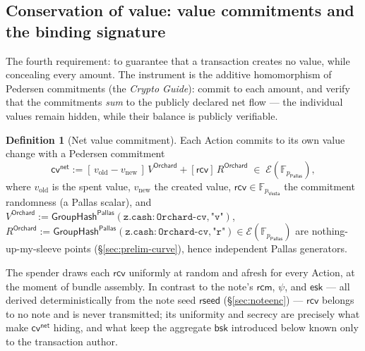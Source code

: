 \documentclass[11pt,a4paper]{article}
\theoremstyle{definition}
\newtheorem{definition}[theorem]{Definition}
\newcommand{\F}{\mathbb{F}}
\newcommand{\cvsym}{\mathsf{cv}}
\newcommand{\Pallas}{\ensuremath{\mathsf{Pallas}}}
\newcommand{\Vesta}{\ensuremath{\mathsf{Vesta}}}
\newcommand{\Ep}{\ensuremath{\mathcal{E}}}
\newcommand{\GroupHash}{\ensuremath{\mathsf{GroupHash}}}
\newcommand{\rcv}{\ensuremath{\mathsf{rcv}}}
\newcommand{\rcm}{\ensuremath{\mathsf{rcm}}}
\begin{document}
\subsection{Conservation of value: value commitments and the binding signature}\label{sec:value}

The fourth requirement: to guarantee that a transaction creates no value, while
concealing every amount. The instrument is the additive homomorphism of
Pedersen commitments (the \emph{Crypto Guide}): commit to each amount, and
verify that the commitments \emph{sum} to the publicly declared net flow --- the
individual values remain hidden, while their balance is publicly verifiable.

\begin{definition}[Net value commitment]\label{def:cv}
Each Action commits to its own value change with a Pedersen commitment
\[
\cvsym^{\mathsf{net}} := [\,v_{\mathrm{old}} - v_{\mathrm{new}}\,]\,V^{\mathsf{Orchard}} + [\rcv]\,R^{\mathsf{Orchard}} \;\in\; \Ep(\F_{p_{\Pallas}}),
\]
where $v_{\mathrm{old}}$ is the spent value, $v_{\mathrm{new}}$ the created
value, $\rcv \in \F_{p_{\Vesta}}$ the commitment randomness (a Pallas
scalar), and
$V^{\mathsf{Orchard}} := \GroupHash^{\Pallas}(\mathtt{z.cash:Orchard\text{-}cv}, \texttt{"v"})$,
$R^{\mathsf{Orchard}} := \GroupHash^{\Pallas}(\mathtt{z.cash:Orchard\text{-}cv}, \texttt{"r"})
\in \Ep(\F_{p_{\Pallas}})$ are nothing-up-my-sleeve points
(\S\ref{sec:prelim-curve}), hence independent Pallas generators.
\end{definition}

The spender draws each $\rcv$ uniformly at random and afresh for every Action,
at the moment of bundle assembly. In contrast to the note's $\rcm$, $\psi$, and
$\mathsf{esk}$ --- all derived deterministically from the note seed
$\mathsf{rseed}$ (\S\ref{sec:noteenc}) --- $\rcv$ belongs to no note and is never
transmitted; its uniformity and secrecy are precisely what make
$\cvsym^{\mathsf{net}}$ hiding, and what keep the aggregate $\mathsf{bsk}$
introduced below known only to the transaction author.
\end{document}

